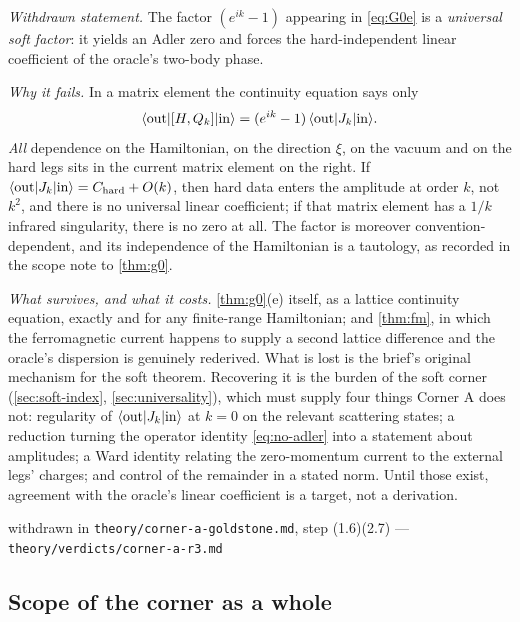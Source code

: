 \begin{refutedclaim}
\label{ref:g0-soft}
\normalfont
\statusRefuted\;
\emph{Withdrawn statement.}  The factor $(e^{ik}-1)$ appearing in
\cref{eq:G0e} is a \emph{universal soft factor}: it yields an Adler zero and
forces the hard-independent linear coefficient of the oracle's two-body phase.

\smallskip\noindent
\emph{Why it fails.}  In a matrix element the continuity equation says only
\begin{equation}
  \langle \mathrm{out}|[H,Q_k]|\mathrm{in}\rangle
  =(e^{ik}-1)\,\langle \mathrm{out}|J_k|\mathrm{in}\rangle .
  \label{eq:no-adler}
\end{equation}
\emph{All} dependence on the Hamiltonian, on the direction $\xi$, on the vacuum
and on the hard legs sits in the current matrix element on the right.  If
$\langle \mathrm{out}|J_k|\mathrm{in}\rangle=C_{\mathrm{hard}}+O(k)$, then hard data
enters the amplitude at order $k$, not $k^2$, and there is no universal linear
coefficient; if that matrix element has a $1/k$ infrared singularity, there is no
zero at all.  The factor is moreover convention-dependent, and its independence of
the Hamiltonian is a tautology, as recorded in the scope note to \cref{thm:g0}.

\smallskip\noindent
\emph{What survives, and what it costs.}  \cref{thm:g0}(e) itself, as a lattice
continuity equation, exactly and for any finite-range Hamiltonian; and
\cref{thm:fm}, in which the ferromagnetic current happens to supply a second
lattice difference and the oracle's dispersion is genuinely rederived.  What is
lost is the brief's original mechanism for the soft theorem.  Recovering it is
the burden of the soft corner (\cref{sec:soft-index}, \cref{sec:universality}),
which must supply four things Corner A does not: regularity of
$\langle \mathrm{out}|J_k|\mathrm{in}\rangle$ at $k=0$ on the relevant scattering
states; a reduction turning the operator identity \cref{eq:no-adler} into a
statement about amplitudes; a Ward identity relating the zero-momentum current to
the external legs' charges; and control of the remainder in a stated norm.  Until
those exist, agreement with the oracle's linear coefficient is a target, not a
derivation.
\end{refutedclaim}

%
{withdrawn in \texttt{theory/corner-a-goldstone.md}, step (1.6)(2.7)}%
{---}%
{\texttt{theory/verdicts/corner-a-r3.md}}

\subsection{Scope of the corner as a whole}

